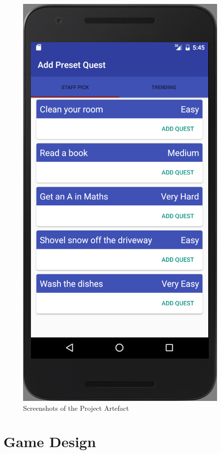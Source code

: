 \begin{figure}[ht]
\begin{minipage}[b]{0.25\linewidth}
    \includegraphics[width=.8\linewidth, frame]{../images/Screenshot/AddPresetQuestScreen.png}
    \vspace{2ex}
  \end{minipage} 
  \caption{Screenshots of the Project Artefact}
  \label{fig:screenshots}
\end{figure}

\section{Game Design}
